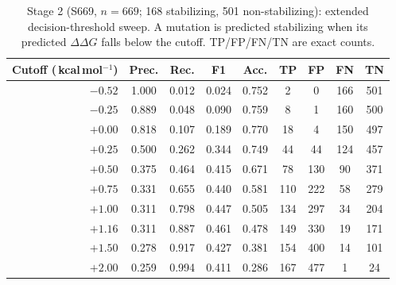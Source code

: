 \documentclass[journal,article,submit,moreauthors]{Definitions/mdpi}
\newcommand{\ddg}{\ensuremath{\Delta\Delta G}}
\newcommand{\kcal}{\,kcal\,mol$^{-1}$}
\begin{document}
\begin{table}[H]
\caption{Stage 2 (S669, $n=669$; 168 stabilizing, 501 non-stabilizing): extended
decision-threshold sweep. A mutation is predicted stabilizing when its predicted \ddg{}
falls below the cutoff. TP/FP/FN/TN are exact counts.}
\label{tab:sweep2}
\begin{tabular}{rcccccccc}
\toprule
\textbf{Cutoff (\kcal)} & \textbf{Prec.} & \textbf{Rec.} & \textbf{F1} & \textbf{Acc.} & \textbf{TP} & \textbf{FP} & \textbf{FN} & \textbf{TN}\\
\midrule
$-0.52$ & 1.000 & 0.012 & 0.024 & 0.752 & 2   & 0   & 166 & 501\\
$-0.25$ & 0.889 & 0.048 & 0.090 & 0.759 & 8   & 1   & 160 & 500\\
$+0.00$ & 0.818 & 0.107 & 0.189 & 0.770 & 18  & 4   & 150 & 497\\
$+0.25$ & 0.500 & 0.262 & 0.344 & 0.749 & 44  & 44  & 124 & 457\\
$+0.50$ & 0.375 & 0.464 & 0.415 & 0.671 & 78  & 130 & 90  & 371\\
$+0.75$ & 0.331 & 0.655 & 0.440 & 0.581 & 110 & 222 & 58  & 279\\
$+1.00$ & 0.311 & 0.798 & 0.447 & 0.505 & 134 & 297 & 34  & 204\\
$+1.16$ & 0.311 & 0.887 & 0.461 & 0.478 & 149 & 330 & 19  & 171\\
$+1.50$ & 0.278 & 0.917 & 0.427 & 0.381 & 154 & 400 & 14  & 101\\
$+2.00$ & 0.259 & 0.994 & 0.411 & 0.286 & 167 & 477 & 1   & 24\\
\bottomrule
\end{tabular}
\end{table}


\end{document}
